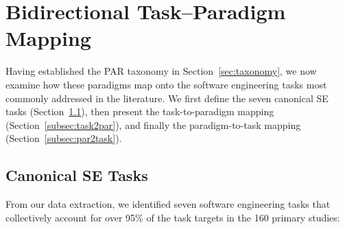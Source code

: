 \section{Bidirectional Task--Paradigm Mapping}
\label{sec:semapping}

Having established the PAR taxonomy in Section~\ref{sec:taxonomy}, we now examine how these
paradigms map onto the software engineering tasks most commonly addressed in the literature.
We first define the seven canonical SE tasks (Section~\ref{subsec:tasks}), then present the
task-to-paradigm mapping (Section~\ref{subsec:task2par}), and finally the paradigm-to-task
mapping (Section~\ref{subsec:par2task}).

\subsection{Canonical SE Tasks}
\label{subsec:tasks}

From our data extraction, we identified seven software engineering tasks that collectively
account for over 95\% of the task targets in the 160 primary studies:

